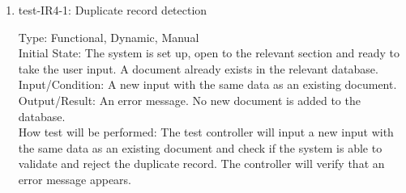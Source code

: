 \documentclass[12pt, titlepage]{article}
\begin{document}
\begin{enumerate}
    
    
    
    

    \item{test-IR4-1}: Duplicate record detection \label{test-IR4-1}
    
    Type: Functional, Dynamic, Manual\\
    
    Initial State: The system is set up, open to the relevant section and ready to take the user input. A document already exists in the relevant database.\\
    
    Input/Condition: A new input with the same data as an existing document.\\
    
    Output/Result: An error message. No new document is added to the database.\\
    
    How test will be performed: The test controller will input a new input with the same data as an existing document and check if the system is able to validate and reject the duplicate record. The controller will verify that an error message appears.

    
    
    

\end{enumerate}
\end{document}
